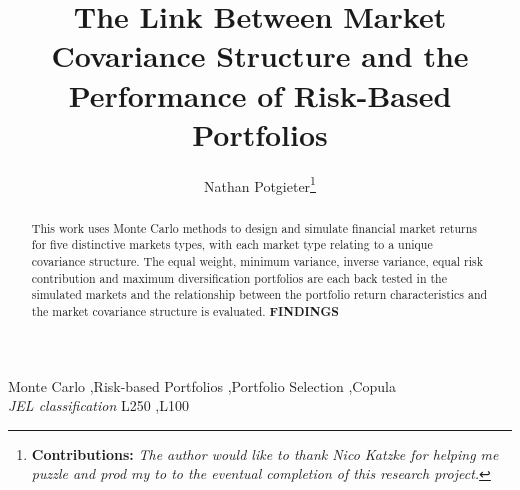 \documentclass[11pt,preprint, authoryear]{elsarticle}
\numberwithin{equation}{section}
\numberwithin{figure}{section}
\numberwithin{table}{section}
\let\rmarkdownfootnote\footnote%
\def\footnote{\protect\rmarkdownfootnote}
\begin{document}
\begin{frontmatter}  %

\title{The Link Between Market Covariance Structure and the Performance of
Risk-Based Portfolios}





\author[Add1]{Nathan Potgieter\footnote{\textbf{Contributions:} \newline \emph{The
  author would like to thank Nico Katzke for helping me puzzle and prod
  my to to the eventual completion of this research project.}}}





\address[Add1]{Stellenbosch University, Stellenbosch, South Africa}


\begin{abstract}
\small{
This work uses Monte Carlo methods to design and simulate financial
market returns for five distinctive markets types, with each market type
relating to a unique covariance structure. The equal weight, minimum
variance, inverse variance, equal risk contribution and maximum
diversification portfolios are each back tested in the simulated markets
and the relationship between the portfolio return characteristics and
the market covariance structure is evaluated. \textbf{FINDINGS}
}
\end{abstract}

\vspace{1cm}

\begin{keyword}
\footnotesize{
Monte Carlo \sep Risk-based Portfolios \sep Portfolio Selection
\sep Copula \\ \vspace{0.3cm}
\textit{JEL classification} L250 \sep L100
}
\end{keyword}
\vspace{0.5cm}
\end{frontmatter}



\pagestyle{fancy}
\chead{}
\rhead{}
\lfoot{}
\lhead{}
\cfoot{}


\headsep 35pt %
\end{document}

